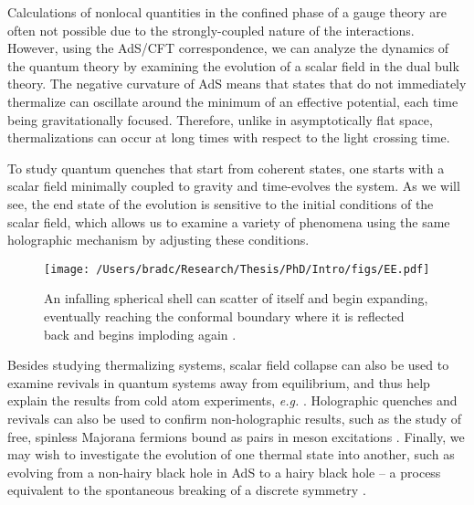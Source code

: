 \documentclass[../PhD.tex]{subfiles}
\begin{document}
Calculations of nonlocal quantities in the confined phase of a gauge theory are often not possible due to the strongly-coupled nature of the interactions. However, using the AdS/CFT correspondence, we can analyze the dynamics of the quantum theory by examining the evolution of a scalar field in the dual bulk theory. The negative curvature of AdS means that states that do not immediately thermalize can oscillate around the minimum of an effective potential, each time being gravitationally focused. Therefore, unlike in asymptotically flat space, thermalizations can occur at long times with respect to the light crossing time. 

To study quantum quenches that start from coherent states, one starts with a scalar field minimally coupled to gravity and time-evolves the system. As we will see, the end state of the evolution is sensitive to the initial conditions of the scalar field, which allows us to examine a variety of phenomena using the same holographic mechanism by adjusting these conditions.

\begin{figure}[h]
\centering
	\texttt{[image: /Users/bradc/Research/Thesis/PhD/Intro/figs/EE.pdf]}	
	\caption[Gravitational picture of a holographic quantum quench in a CFT]{An infalling spherical shell can scatter of itself and begin expanding, eventually reaching the conformal boundary where it is reflected back and begins imploding again {\rm \cite{1412.6002}}.}
	\label{fig: EE}
\end{figure}

Besides studying thermalizing systems, scalar field collapse can also be used to examine revivals in quantum systems away from equilibrium, and thus help explain the results from cold atom experiments, {\it e.g.} \cite{Dziarmaga2010, 2011arXiv1106.3567L}. Holographic quenches and revivals can also be used to confirm non-holographic results, such as the study of free, spinless Majorana fermions bound as pairs in meson excitations \cite{1706.02438}. Finally, we may wish to investigate the evolution of one thermal state into another, such as evolving from a non-hairy black hole in AdS to a hairy black hole -- a process equivalent to the spontaneous breaking of a discrete symmetry \cite{1704.05454}.
\end{document}
